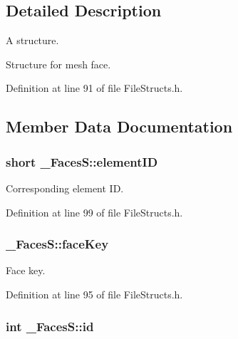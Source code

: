 \subsection{Detailed Description}
A structure. 

Structure for mesh face. 

Definition at line 91 of file File\+Structs.\+h.



\subsection{Member Data Documentation}
\subsubsection[{\texorpdfstring{element\+ID}{elementID}}]{\setlength{\rightskip}{0pt plus 5cm}short \+\_\+\+Faces\+S\+::element\+ID}\hypertarget{struct___faces_s_a430ed7b14ef236bea40b0a9be2801c94}{}\label{struct___faces_s_a430ed7b14ef236bea40b0a9be2801c94}


Corresponding element ID. 



Definition at line 99 of file File\+Structs.\+h.

\subsubsection[{\texorpdfstring{face\+Key}{faceKey}}]{ \+\_\+\+Faces\+S\+::face\+Key}\hypertarget{struct___faces_s_a0b72e5930902a49f376d035d654ecef8}{}\label{struct___faces_s_a0b72e5930902a49f376d035d654ecef8}


Face key. 



Definition at line 95 of file File\+Structs.\+h.

\subsubsection[{\texorpdfstring{id}{id}}]{\setlength{\rightskip}{0pt plus 5cm}int \+\_\+\+Faces\+S\+::id}\hypertarget{struct___faces_s_a7365ff5c5951b2a61ef5e4411b0d521a}{}\label{struct___faces_s_a7365ff5c5951b2a61ef5e4411b0d521a}


